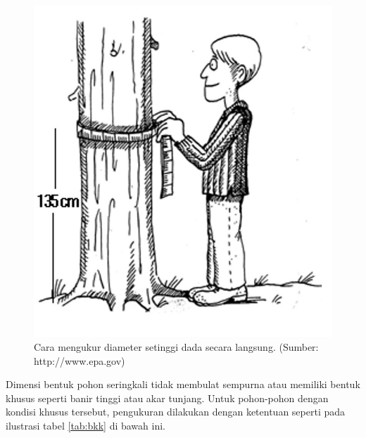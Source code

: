 \documentclass[
  oneside]{book}
\begin{document}
\begin{figure}

{\centering \includegraphics[width=1\linewidth]{images/dbhm_ilustration} 

}

\caption{Cara mengukur diameter setinggi dada secara langsung. (Sumber: http://www.epa.gov)}\label{fig:figdbhm}
\end{figure}

Dimensi bentuk pohon seringkali tidak membulat sempurna atau memiliki bentuk khusus seperti banir tinggi atau akar tunjang. Untuk pohon-pohon dengan kondisi khusus tersebut, pengukuran dilakukan dengan ketentuan seperti pada ilustrasi tabel \ref{tab:bkk} di bawah ini.
\end{document}
